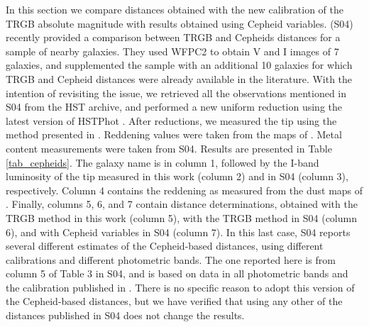 \documentclass[11pt,preprint2]{aastex}
\begin{document}
In this section we compare distances obtained with the new calibration of the TRGB absolute magnitude with results obtained using Cepheid variables. 
\cite{2004ApJ...608...42S} (S04) recently provided a comparison between TRGB and Cepheids distances for a sample of nearby galaxies. They used WFPC2 to obtain V and I images of 7 galaxies, and supplemented the sample with an additional 10 galaxies for which TRGB and Cepheid distances were already available in the literature. With the intention of revisiting the issue, we retrieved all the observations mentioned in S04 from the HST archive, and performed a new uniform reduction using the latest version of HSTPhot 
\cite{2000PASP..112.1383D}.   After reductions, we measured the tip using the method presented in \cite{2006AJ....132.2729M}. Reddening values were taken from the maps of \cite{1998ApJ...500..525S}. Metal content measurements were taken from  S04. Results are presented in Table \ref{tab_cepheids}. The galaxy name is in column 1, followed by the I-band luminosity of the tip measured in this work (column 2) and in S04 (column 3), respectively. Column 4 contains the reddening as measured from the dust maps of \cite{1998ApJ...500..525S}. Finally, columns 5, 6, and 7 contain distance determinations, obtained with the TRGB method in this work (column 5), with the TRGB method in S04 (column 6), and with Cepheid variables in S04 (column 7). In this last case, S04 reports several different estimates of the Cepheid-based distances, using different calibrations and different photometric bands. The one reported here is from column 5 of Table 3 in S04, and is based on data in all photometric bands and the calibration published in \cite{1991PASP..103..933M}. There is no specific reason to adopt this version of the Cepheid-based distances, but we have verified that using any other of the distances published in S04 does not change the results.
\end{document}
